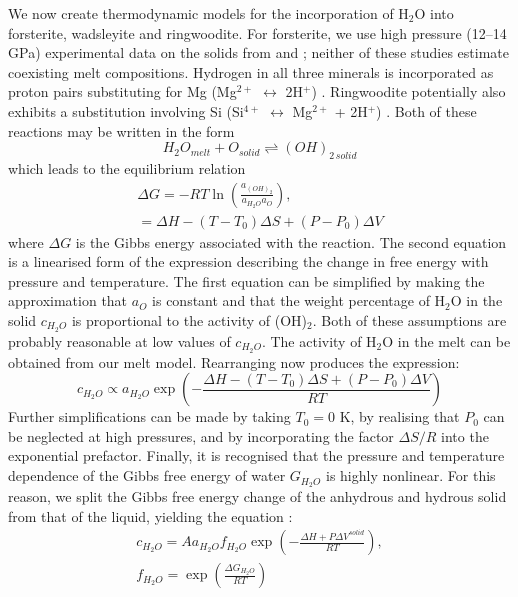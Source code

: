 \documentclass[review]{elsarticle}
\begin{document}
We now create thermodynamic models for the incorporation of H$_2$O into forsterite, wadsleyite and ringwoodite. For forsterite, we use high pressure (12--14 GPa) experimental data on the solids from \cite{SFNHB2006} and \cite{LSKO2009}; neither of these studies estimate coexisting melt compositions. Hydrogen in all three minerals is incorporated as proton pairs substituting for Mg (Mg$^{2+}$ $\leftrightarrow$ 2H$^{+}$) \citep{Smyth1987, SHFJLM2003}. Ringwoodite potentially also exhibits a substitution involving Si (Si$^{4+}$ $\leftrightarrow$ Mg$^{2+}$ + 2H$^{+}$) \citep{KKMO2000}. Both of these reactions may be written in the form 
\begin{equation}
H_2O_{melt} + O_{solid} \rightleftharpoons (OH)_{2\, solid}
\end{equation}
which leads to the equilibrium relation 
\begin{eqnarray}
\Delta G = -R T \ln \left( \frac{a_{(OH)_2}}{a_{H_2O}a_{O}} \right), \\
= \Delta H - (T-T_0) \Delta S + (P-P_0) \Delta V
\end{eqnarray}
where $\Delta G$ is the Gibbs energy associated with the reaction. The second equation is a linearised form of the expression describing the change in free energy with pressure and temperature. The first equation can be simplified by making the approximation that $a_O$ is constant and that the weight percentage of H$_2$O in the solid $c_{H_2O}$ is proportional to the activity of (OH)$_2$. Both of these assumptions are probably reasonable at low values of $c_{H_2O}$. The activity of H$_2$O in the melt can be obtained from our melt model. Rearranging now produces the expression:
\begin{equation}
c_{H_2O} \propto a_{H_2O} \exp{ \left( -\frac{\Delta H - (T-T_0) \Delta S + (P-P_0) \Delta V}{R T} \right) }
\end{equation}
Further simplifications can be made by taking $T_0 = 0$ K, by realising that $P_0$ can be neglected at high pressures, and by incorporating the factor $\Delta S/R$ into the exponential prefactor. Finally, it is recognised that the pressure and temperature dependence of the Gibbs free energy of water $G_{H_2O}$ is highly nonlinear. For this reason, we split the Gibbs free energy change of the anhydrous and hydrous solid from that of the liquid, yielding the equation \citep{KB2006}:
\begin{eqnarray}
c_{H_2O} = A a_{H_2O} f_{H_2O} \exp{ \left( -\frac{\Delta H + P \Delta V^{solid}}{R T} \right) }, \\
f_{H_2O} = \exp \left(\frac{\Delta G_{H_2O}}{RT} \right)
\end{eqnarray}
\end{document}
